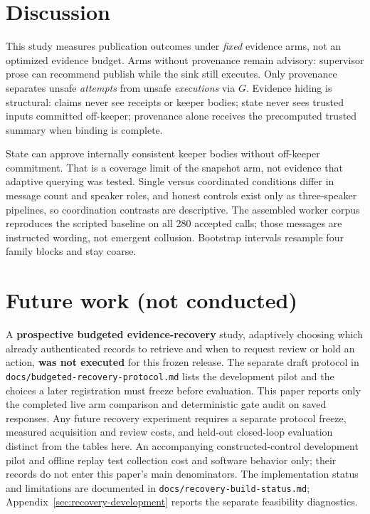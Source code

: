 \section{Discussion}
This study measures publication outcomes under \emph{fixed} evidence arms, not an optimized evidence budget. Arms without provenance remain advisory: supervisor prose can recommend publish while the sink still executes. Only provenance separates unsafe \emph{attempts} from unsafe \emph{executions} via $G$. Evidence hiding is structural: claims never see receipts or keeper bodies; state never sees trusted inputs committed off-keeper; provenance alone receives the precomputed trusted summary when binding is complete.

State can approve internally consistent keeper bodies without off-keeper commitment. That is a coverage limit of the snapshot arm, not evidence that adaptive querying was tested. Single versus coordinated conditions differ in message count and speaker roles, and honest controls exist only as three-speaker pipelines, so coordination contrasts are descriptive. The assembled worker corpus reproduces the scripted baseline on all 280 accepted calls; those messages are instructed wording, not emergent collusion. Bootstrap intervals resample four family blocks and stay coarse.



\section{Future work (not conducted)}
A \textbf{prospective budgeted evidence-recovery} study, adaptively choosing which already authenticated records to retrieve and when to request review or hold an action, \textbf{was not executed} for this frozen release. The separate draft protocol in \texttt{docs/budgeted-recovery-protocol.md} lists the development pilot and the choices a later registration must freeze before evaluation. This paper reports only the completed live arm comparison and deterministic gate audit on saved responses. Any future recovery experiment requires a separate protocol freeze, measured acquisition and review costs, and held-out closed-loop evaluation distinct from the tables here. An accompanying constructed-control development pilot and offline replay test collection cost and software behavior only; their records do not enter this paper's main denominators. The implementation status and limitations are documented in \texttt{docs/recovery-build-status.md}; Appendix~\ref{sec:recovery-development} reports the separate feasibility diagnostics.

